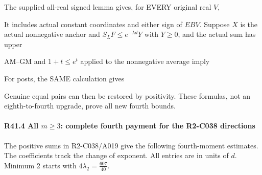 The supplied all-real signed lemma gives, for EVERY original real \(V\),


It includes actual constant coordinates and either sign of \(EBV\). Suppose \(X\) is the actual nonnegative anchor and \(S_LF\le e^{-\lambda d}Y\) with \(Y\ge 0\), and the actual sum has upper


AM--GM and \(1+t\le e^t\) applied to the nonnegative average imply


For posts, the SAME calculation gives


 Genuine equal pairs can then be restored by positivity. These formulas, not an eighth-to-fourth upgrade, prove all new fourth bounds.

\paragraph{R41.4 All \(m\ge 3\): complete fourth payment for the R2-C038 directions}

The positive sums in R2-C038/A019 give the following fourth-moment estimates. The coefficients track the change of exponent. All entries are in units of \(d\). Minimum 2 starts with \(4\lambda_2=\frac{607}{40}\).



